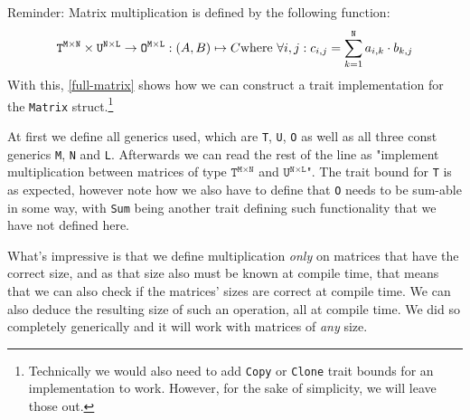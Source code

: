 Reminder: Matrix multiplication is defined by the following function:
\begin{equation*}
\texttt{T}^{\texttt{M} \times \texttt{N}} \times \texttt{U}^{\texttt{N} \times \texttt{L}} \to \texttt{O}^{\texttt{M} \times \texttt{L}} : (A, B) \mapsto C \\
\text{where } \forall i, j: c_{i, j} = \sum_{k = 1}^{\texttt{N}} a_{i, k} \cdot b_{k, j}
\end{equation*}
With this, \autoref{full-matrix} shows how we can construct a trait implementation for the \verb|Matrix| struct.\footnote{Technically we would also need to add \verb|Copy| or \verb|Clone| trait bounds for an implementation to work. However, for the sake of simplicity, we will leave those out.}

At first we define all generics used, which are \verb|T|, \verb|U|, \verb|O| as well as all three const generics \verb|M|, \verb|N| and \verb|L|.
Afterwards we can read the rest of the line as "implement multiplication between matrices of type \( \texttt{T}^{\texttt{M} \times \texttt{N}} \) and \( \texttt{U}^{\texttt{N} \times \texttt{L}} \)". The trait bound for \verb|T| is as expected, however note how we also have to define that \verb|O| needs to be sum-able in some way, with \verb|Sum| being another trait defining such functionality that we have not defined here.

What's impressive is that we define multiplication \emph{only} on matrices that have the correct size, and as that size also must be known at compile time, that means that we can also check if the matrices' sizes are correct at compile time. We can also deduce the resulting size of such an operation, all at compile time. We did so completely generically and it will work with matrices of \emph{any} size.
